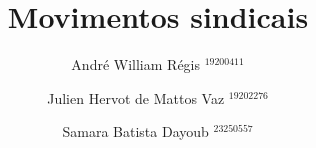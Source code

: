\documentclass{beamer}
\title{Movimentos sindicais}
\author{André William Régis $^{19200411}$ \\
	\and Julien Hervot de Mattos Vaz $^{19202276}$ \\
	\and Samara Batista Dayoub $^{23250557}$ \\
}
\institute{UFSC}
\begin{document}
\frame{\titlepage}



\end{document}
